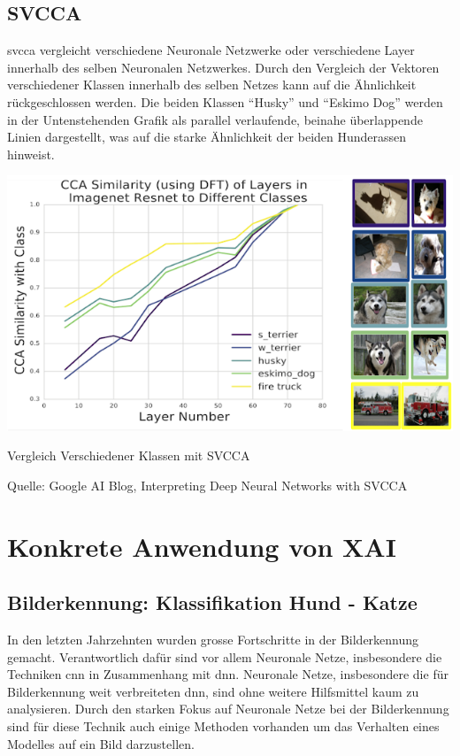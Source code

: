 \documentclass[
  12pt, %
  a4paper, %
  oneside, %
  openany, 
  numbers=noenddot, %
  BCOR=5mm, %
  parskip=half*, %
  thesis, %
]{bfhbook}
\begin{document}
\section{SVCCA}
\acrlong{svcca} \parencite{Raghu2017} vergleicht verschiedene Neuronale Netzwerke oder verschiedene Layer innerhalb des selben Neuronalen Netzwerkes.
\break
Durch den Vergleich der Vektoren verschiedener Klassen innerhalb des selben Netzes kann auf die Ähnlichkeit rückgeschlossen werden. Die beiden Klassen ``Husky'' und ``Eskimo Dog'' werden in der Untenstehenden Grafik als parallel verlaufende, beinahe überlappende Linien dargestellt, was auf die starke Ähnlichkeit der beiden Hunderassen hinweist.
\begin{center}
\begin{minipage}[t]{\linewidth}
 	\includegraphics[width=\textwidth]{Bilder/svcca-similarities.png}
    	\caption{Vergleich Verschiedener Klassen mit SVCCA}
    	\caption*{Quelle: Google AI Blog, Interpreting Deep Neural Networks with SVCCA}
\end{minipage}
\end{center}
\cite{svccaLink}

\chapter{Konkrete Anwendung von XAI}

\section{Bilderkennung: Klassifikation Hund - Katze}

In den letzten Jahrzehnten wurden grosse Fortschritte in der Bilderkennung gemacht. Verantwortlich dafür sind vor allem Neuronale Netze, insbesondere die Techniken \acrfull{cnn} in Zusammenhang mit {dnn}. Neuronale Netze, insbesondere die für Bilderkennung weit verbreiteten \acrfull{dnn}, sind ohne weitere Hilfsmittel kaum zu analysieren.
Durch den starken Fokus auf Neuronale Netze bei der Bilderkennung sind für diese Technik auch einige Methoden vorhanden um das Verhalten eines Modelles  auf ein Bild darzustellen.
\end{document}

